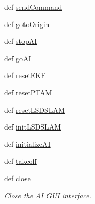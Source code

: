 \begin{DoxyCompactItemize}
\item 
def \hyperlink{classstaircaseai_1_1staircaseAI_a0e7b18b6a8d981ee6156ac1d3bc05485}{send\-Command}
\item 
def \hyperlink{classstaircaseai_1_1staircaseAI_a7321e77bc12492d99fb34ff729fb29c2}{goto\-Origin}
\item 
def \hyperlink{classstaircaseai_1_1staircaseAI_adf368404f5be7a0f97a858d620000456}{stop\-A\-I}
\item 
def \hyperlink{classstaircaseai_1_1staircaseAI_a1a4d524a29a3fbe6151151b42beede65}{go\-A\-I}
\item 
def \hyperlink{classstaircaseai_1_1staircaseAI_a4a69816800ed71ce87bd49427e5106e5}{reset\-E\-K\-F}
\item 
def \hyperlink{classstaircaseai_1_1staircaseAI_a0018cc957508941977beb292aa38e660}{reset\-P\-T\-A\-M}
\item 
def \hyperlink{classstaircaseai_1_1staircaseAI_a4c6f190b346d73401b6a93e1f6018565}{reset\-L\-S\-D\-S\-L\-A\-M}
\item 
def \hyperlink{classstaircaseai_1_1staircaseAI_aab2dc561edc8cb7b6575ce6a82fa19d4}{init\-L\-S\-D\-S\-L\-A\-M}
\item 
def \hyperlink{classstaircaseai_1_1staircaseAI_ad23031b5507a48abfbfea19671cf73ca}{initialize\-A\-I}
\item 
def \hyperlink{classstaircaseai_1_1staircaseAI_a0d82ca122f05000e0192e5f6e4810e43}{takeoff}
\item 
def \hyperlink{classstaircaseai_1_1staircaseAI_ace7a55f711f5fb559531fe5f6a1ea61f}{close}
\begin{DoxyCompactList}\small\item\em Close the A\-I G\-U\-I interface. \end{DoxyCompactList}\end{DoxyCompactItemize}
